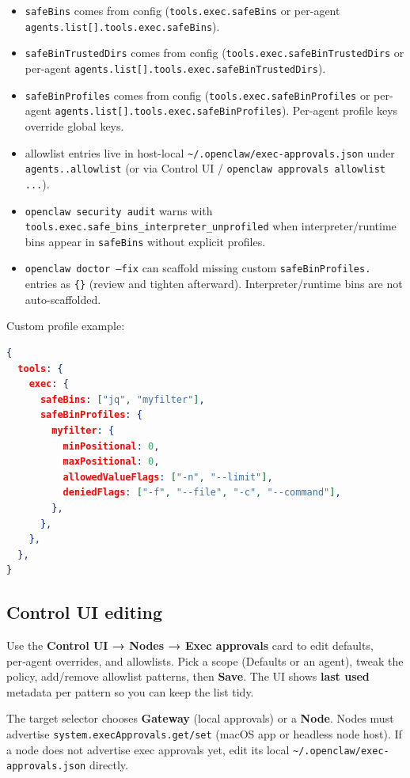 \begin{itemize}
  \item \texttt{safeBins} comes from config (\texttt{tools.exec.safeBins} or per-agent \texttt{agents.list[].tools.exec.safeBins}).
  \item \texttt{safeBinTrustedDirs} comes from config (\texttt{tools.exec.safeBinTrustedDirs} or per-agent \texttt{agents.list[].tools.exec.safeBinTrustedDirs}).
  \item \texttt{safeBinProfiles} comes from config (\texttt{tools.exec.safeBinProfiles} or per-agent \texttt{agents.list[].tools.exec.safeBinProfiles}). Per-agent profile keys override global keys.
  \item allowlist entries live in host-local \texttt{\textasciitilde{}/.openclaw/exec-approvals.json} under \texttt{agents..allowlist} (or via Control UI / \texttt{openclaw approvals allowlist ...}).
  \item \texttt{openclaw security audit} warns with \texttt{tools.exec.safe\_bins\_interpreter\_unprofiled} when interpreter/runtime bins appear in \texttt{safeBins} without explicit profiles.
  \item \texttt{openclaw doctor --fix} can scaffold missing custom \texttt{safeBinProfiles.} entries as \texttt{\{\}} (review and tighten afterward). Interpreter/runtime bins are not auto-scaffolded.
\end{itemize}


Custom profile example:

\begin{lstlisting}[language=json]
{
  tools: {
    exec: {
      safeBins: ["jq", "myfilter"],
      safeBinProfiles: {
        myfilter: {
          minPositional: 0,
          maxPositional: 0,
          allowedValueFlags: ["-n", "--limit"],
          deniedFlags: ["-f", "--file", "-c", "--command"],
        },
      },
    },
  },
}
\end{lstlisting}


\subsection{Control UI editing}


Use the \textbf{Control UI → Nodes → Exec approvals} card to edit defaults, per‑agent
overrides, and allowlists. Pick a scope (Defaults or an agent), tweak the policy,
add/remove allowlist patterns, then \textbf{Save}. The UI shows \textbf{last used} metadata
per pattern so you can keep the list tidy.

The target selector chooses \textbf{Gateway} (local approvals) or a \textbf{Node}. Nodes
must advertise \texttt{system.execApprovals.get/set} (macOS app or headless node host).
If a node does not advertise exec approvals yet, edit its local
\texttt{\textasciitilde{}/.openclaw/exec-approvals.json} directly.

